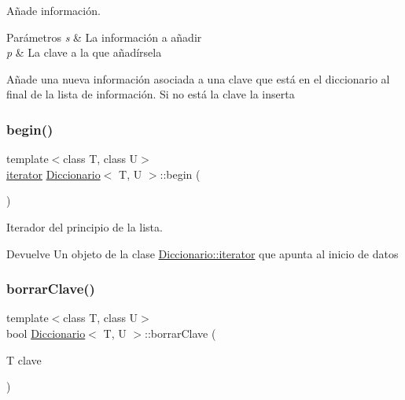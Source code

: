 Añade información. 


\begin{DoxyParams}{Parámetros}
{\em s} & La información a añadir \\
\hline
{\em p} & La clave a la que añadírsela\\
\hline
\end{DoxyParams}
Añade una nueva información asociada a una clave que está en el diccionario al final de la lista de información. Si no está la clave la inserta \mbox{\label{classDiccionario_aa17ce3d7317d78f5927ae7c0564089cc}} 
\subsubsection{\texorpdfstring{begin()}{begin()}}
{\footnotesize\ttfamily template$<$class T, class U$>$ \\
\hyperlink{classDiccionario_1_1iterator}{iterator} \hyperlink{classDiccionario}{Diccionario}$<$ T, U $>$\+::begin (\begin{DoxyParamCaption}{ }\end{DoxyParamCaption})}



Iterador del principio de la lista. 

\begin{DoxyReturn}{Devuelve}
Un objeto de la clase \hyperlink{classDiccionario_1_1iterator}{Diccionario\+::iterator} que apunta al inicio de datos 
\end{DoxyReturn}
\mbox{\label{classDiccionario_ab4c7aabdad91cf517db259a371984cdf}} 
\subsubsection{\texorpdfstring{borrar\+Clave()}{borrarClave()}}
{\footnotesize\ttfamily template$<$class T, class U$>$ \\
bool \hyperlink{classDiccionario}{Diccionario}$<$ T, U $>$\+::borrar\+Clave (\begin{DoxyParamCaption}\item[{T}]{clave }\end{DoxyParamCaption})}



